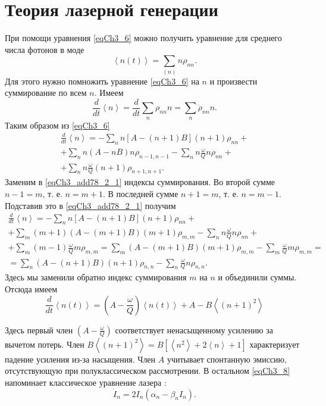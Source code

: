 \section{Теория лазерной генерации}
При помощи уравнения \eqref{eqCh3_6} можно получить уравнение для
среднего числа фотонов в моде 
\[
\left<n\left(t\right)\right> =\sum_{(n)}n\rho_{nn}.
\]
Для этого нужно помножить уравнение \eqref{eqCh3_6} на $n$ и
произвести суммирование по всем $n$. Имеем
\[
\frac{d}{dt}\left<n\right> = \frac{d}{dt}\sum_n\rho_{nn}n = 
\sum_n\dot{\rho}_{nn}n.
\]
Таким образом из \eqref{eqCh3_6}
\begin{eqnarray}
\frac{d}{dt}\left<n\right> = 
-\sum_n n \left[A - \left(n + 1\right)B\right]\left(n + 1\right)\rho_{nn} +
\nonumber \\
+ \sum_n n\left(A - n B\right)n \rho_{n - 1, n - 1} 
- \sum_n n\frac{\omega}{Q}n \rho_{nn} + 
\nonumber \\
+ \sum_n n \frac{\omega}{Q} \left(n + 1\right)\rho_{n + 1, n + 1}.
\label{eqCh3_add78_2_1}
\end{eqnarray}
Заменим в \eqref{eqCh3_add78_2_1} индексы суммирования. Во второй
сумме $n - 1 = m$, т. е. $n = m + 1$. В последней сумме 
$n + 1 = m$, т. е. $n = m - 1$. Подставив это в
\eqref{eqCh3_add78_2_1} получим
\begin{eqnarray}
\frac{d}{dt}\left<n\right>  = 
-\sum_n n \left[A - \left(n + 1\right)B\right]\left(n + 1\right)\rho_{nn} +
\nonumber \\
+ \sum_m \left(m + 1\right)\left(A - \left(m + 1\right)B\right)\left(m + 1\right) \rho_{m, m} 
- \sum_n n\frac{\omega}{Q}n \rho_{nn} + 
\nonumber \\
+ \sum_m \left(m - 1\right) \frac{\omega}{Q} m\rho_{m, m} = 
\sum_m \left(A - \left(m + 1\right) B\right)\left(m + 1\right) \rho_{m, m} - 
\sum_m \frac{\omega}{Q} m\rho_{m, m} = 
\nonumber \\
= \sum_n \left(A - \left(n + 1\right) B\right)\left(n + 1\right) \rho_{n, n} - 
\sum_n \frac{\omega}{Q} n\rho_{n, n}.
\nonumber
\end{eqnarray}
Здесь мы заменили обратно индекс суммирования $m$ на $n$ и объединили суммы.
Отсюда имеем
\begin{equation}
\frac{d}{d t}\left<n\left(t\right)\right> = 
\left(A - \frac{\omega}{Q}\right)\left<n\left(t\right)\right>
+ A - B \left<\left(n + 1\right)^2\right>
\label{eqCh3_8}
\end{equation}

Здесь первый член $\left(A - \frac{\omega}{Q}\right)$ соответствует
ненасыщенному усилению за вычетом 
потерь. Член 
$B\left<\left(n + 1\right)^2\right> = B \left[\left<n^2\right> + 2
  \left<n\right> + 1\right]$
характеризует падение усиления из-за насыщения. Член $A$
учитывает спонтанную эмиссию, отсутствующую при полуклассическом
рассмотрении. В остальном \eqref{eqCh3_8} напоминает классическое
уравнение лазера \cite{bQuantumOpticsAndRadioPhisicsLecture1966}:
\[
\dot{I}_n = 2 I_n\left(\alpha_n - \beta_n I_n\right).
\]
